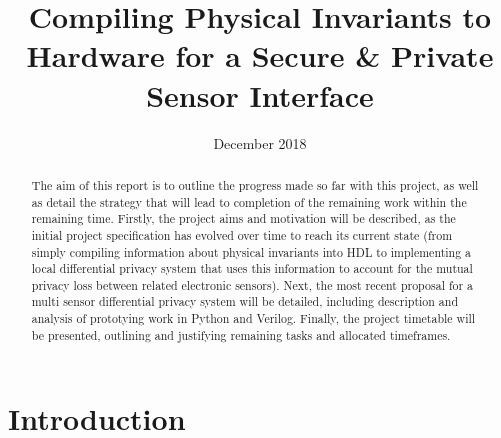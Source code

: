 \documentclass[pageno]{jpaper}
\begin{document}
\title{
Compiling Physical Invariants to Hardware for a Secure \& Private Sensor Interface}

\date{December 2018}
\maketitle

\thispagestyle{empty}

\begin{abstract}

The aim of this report is to outline the progress made so far with this project, as well as detail the strategy that will lead to completion of the remaining work within the remaining time. Firstly, the project aims and motivation will be described, as the initial project specification has evolved over time to reach its current state (from simply compiling information about physical invariants into HDL to implementing a local differential privacy system that uses this information to account for the mutual privacy loss between related electronic sensors). Next, the most recent proposal for a multi sensor differential privacy system will be detailed, including description and analysis of prototying work in Python and Verilog. Finally, the project timetable will be presented, outlining and justifying remaining tasks and allocated timeframes.

\end{abstract}

\section{Introduction}

%
%
\end{document}

